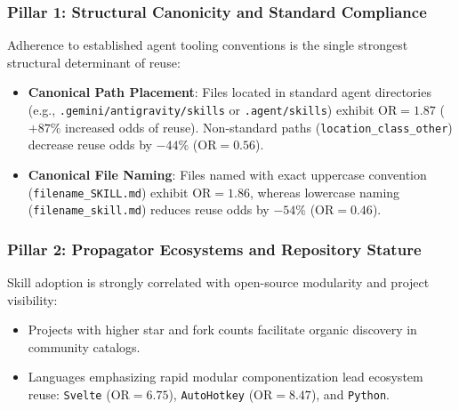 \documentclass[12pt]{article}
\begin{document}
\subsubsection{Pillar 1: Structural Canonicity and Standard Compliance}
Adherence to established agent tooling conventions is the single strongest structural determinant of reuse:
\begin{itemize}
    \item \textbf{Canonical Path Placement}: Files located in standard agent directories (e.g., \texttt{.gemini/antigravity/skills} or \texttt{.agent/skills}) exhibit $\text{OR} = 1.87$ ($+87\%$ increased odds of reuse). Non-standard paths (\texttt{location\_class\_other}) decrease reuse odds by $-44\%$ ($\text{OR} = 0.56$).
    \item \textbf{Canonical File Naming}: Files named with exact uppercase convention (\texttt{filename\_SKILL.md}) exhibit $\text{OR} = 1.86$, whereas lowercase naming (\texttt{filename\_skill.md}) reduces reuse odds by $-54\%$ ($\text{OR} = 0.46$).
\end{itemize}

\subsubsection{Pillar 2: Propagator Ecosystems and Repository Stature}
Skill adoption is strongly correlated with open-source modularity and project visibility:
\begin{itemize}
    \item Projects with higher star and fork counts facilitate organic discovery in community catalogs.
    \item Languages emphasizing rapid modular componentization lead ecosystem reuse: \texttt{Svelte} ($\text{OR} = 6.75$), \texttt{AutoHotkey} ($\text{OR} = 8.47$), and \texttt{Python}.
\end{itemize}
\end{document}
